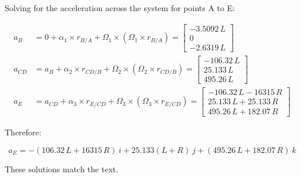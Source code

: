 \documentclass[12pt, letterpaper]{../assignment}
\begin{document}
Solving for the acceleration across the system for points A to E:

\begin{equation*}
    \begin{aligned}
        a_B &= 0 + \alpha_1 \times r_{B/A} + \Omega_1 \times \left(\Omega_1 \times r_{B/A}\right)
        =\left[\begin{array}{c} -3.5092\,L\\ 0\\ -2.6319\,L \end{array}\right]\\
        a_{CD} &= a_B + \alpha_2 \times r_{CD/B} + \Omega_2 \times \left(\Omega_2 \times r_{CD/B}\right)
        =\left[\begin{array}{c} -106.32\,L\\ 25.133\,L\\ 495.26\,L \end{array}\right]\\
        a_E &= a_{CD} + \alpha_3 \times r_{E/CD} + \Omega_3 \times \left(\Omega_3 \times r_{E/CD}\right)
        =\left[\begin{array}{c} -106.32\,L-16315\,R\\ 25.133\,L+25.133\,R\\ 495.26\,L+182.07\,R \end{array}\right]
    \end{aligned}
\end{equation*}

Therefore:

\begin{answer}
$$ a_E = -(106.32\,L+16315\,R)\ i + 25.133(L+R)\ j + (495.26\,L+182.07\,R)\ k $$
\end{answer}

These solutions match the text.






\end{document}
